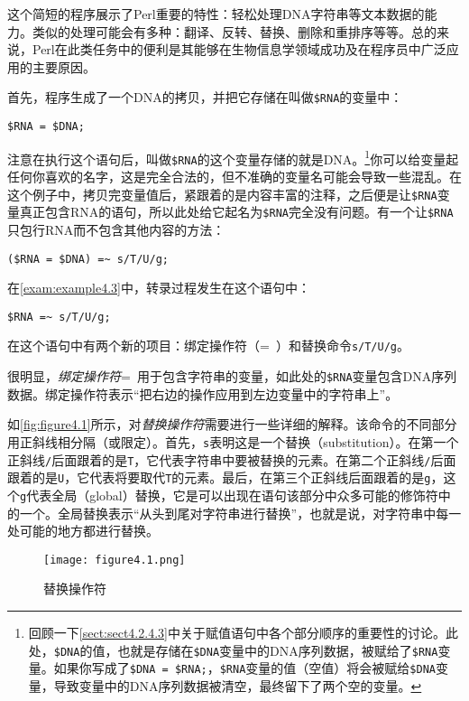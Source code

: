 这个简短的程序展示了Perl重要的特性：轻松处理DNA字符串等文本数据的能力。类似的处理可能会有多种：翻译、反转、替换、删除和重排序等等。总的来说，Perl在此类任务中的便利是其能够在生物信息学领域成功及在程序员中广泛应用的主要原因。

首先，程序生成了一个DNA的拷贝，并把它存储在叫做\verb|$RNA|的变量中：

\begin{lstlisting}
$RNA = $DNA;
\end{lstlisting}

注意在执行这个语句后，叫做\verb|$RNA|的这个变量存储的就是DNA。\footnote{回顾一下\autoref{sect:sect4.2.4.3}中关于赋值语句中各个部分顺序的重要性的讨论。此处，\verb|$DNA|的值，也就是存储在\verb|$DNA|变量中的DNA序列数据，被赋给了\verb|$RNA|变量。如果你写成了\verb|$DNA = $RNA;|，\verb|$RNA|变量的值（空值）将会被赋给\verb|$DNA|变量，导致变量中的DNA序列数据被清空，最终留下了两个空的变量。}你可以给变量起任何你喜欢的名字，这是完全合法的，但不准确的变量名可能会导致一些混乱。在这个例子中，拷贝完变量值后，紧跟着的是内容丰富的注释，之后便是让\verb|$RNA|变量真正包含RNA的语句，所以此处给它起名为\verb|$RNA|完全没有问题。有一个让\verb|$RNA|只包行RNA而不包含其他内容的方法：

\begin{lstlisting}
($RNA = $DNA) =~ s/T/U/g;
\end{lstlisting}

在\autoref{exam:example4.3}中，转录过程发生在这个语句中：

\begin{lstlisting}
$RNA =~ s/T/U/g;
\end{lstlisting}

在这个语句中有两个新的项目：绑定操作符（=~）和替换命令\verb|s/T/U/g|。

很明显，\textit{绑定操作符}=~用于包含字符串的变量，如此处的\verb|$RNA|变量包含DNA序列数据。绑定操作符表示“把右边的操作应用到左边变量中的字符串上”。

如\autoref{fig:figure4.1}所示，对\textit{替换操作符}需要进行一些详细的解释。该命令的不同部分用正斜线相分隔（或限定）。首先，\verb|s|表明这是一个替换（substitution）。在第一个正斜线\verb|/|后面跟着的是\verb|T|，它代表字符串中要被替换的元素。在第二个正斜线\verb|/|后面跟着的是\verb|U|，它代表将要取代\verb|T|的元素。最后，在第三个正斜线后面跟着的是\verb|g|，这个\verb|g|代表全局（global）替换，它是可以出现在语句该部分中众多可能的修饰符中的一个。全局替换表示“从头到尾对字符串进行替换”，也就是说，对字符串中每一处可能的地方都进行替换。

\begin{figure}
  \centering
  \texttt{[image: figure4.1.png]}
  \caption{替换操作符}
  \label{fig:figure4.1}
\end{figure}

